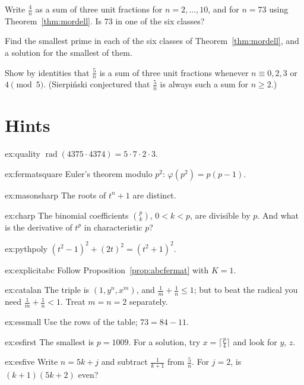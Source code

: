 \begin{exercise}[$\star$]\label{ex:essmall}
Write $\frac4n$ as a sum of three unit fractions for $n=2,\dots,10$, and for $n=73$ using Theorem~\ref{thm:mordell}. Is $73$ in one of the six classes?
\end{exercise}

\begin{exercise}[$\star\star$]\label{ex:esfirst}
Find the smallest prime in each of the six classes of Theorem~\ref{thm:mordell}, and a solution for the smallest of them.
\end{exercise}

\begin{exercise}[$\star\star$]\label{ex:esfive}
Show by identities that $\frac5n$ is a sum of three unit fractions whenever $n\equiv0,2,3$ or $4\pmod5$. (Sierpi\'nski conjectured that $\frac5n$ is
always such a sum for $n\ge2$.)
\end{exercise}

\section{Hints}

\begin{hint}{ex:quality}
$\operatorname{rad}(4375\cdot4374)=5\cdot7\cdot2\cdot3$.
\end{hint}
\begin{hint}{ex:fermatsquare}
Euler's theorem modulo $p^2$: $\varphi(p^2)=p(p-1)$.
\end{hint}
\begin{hint}{ex:masonsharp}
The roots of $t^n+1$ are distinct.
\end{hint}
\begin{hint}{ex:charp}
The binomial coefficients $\binom pk$, $0<k<p$, are divisible by $p$. And what is the derivative of $t^p$ in characteristic $p$?
\end{hint}
\begin{hint}{ex:pythpoly}
$(t^2-1)^2+(2t)^2=(t^2+1)^2$.
\end{hint}
\begin{hint}{ex:explicitabc}
Follow Proposition~\ref{prop:abcfermat} with $K=1$.
\end{hint}
\begin{hint}{ex:catalan}
The triple is $(1,y^n,x^m)$, and $\frac1m+\frac1n\le1$; but to beat the radical you need $\frac1m+\frac1n<1$. Treat $m=n=2$ separately.
\end{hint}
\begin{hint}{ex:essmall}
Use the rows of the table; $73=84-11$.
\end{hint}
\begin{hint}{ex:esfirst}
The smallest is $p=1009$. For a solution, try $x=\lceil\frac p4\rceil$ and look for $y$, $z$.
\end{hint}
\begin{hint}{ex:esfive}
Write $n=5k+j$ and subtract $\frac1{k+1}$ from $\frac5n$. For $j=2$, is $(k+1)(5k+2)$ even?
\end{hint}

